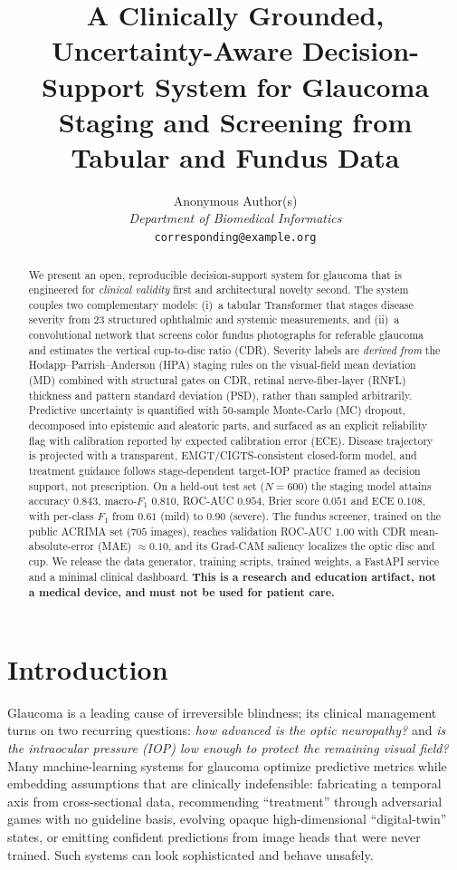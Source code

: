 \documentclass[10pt,twocolumn]{article}
\title{\textbf{A Clinically Grounded, Uncertainty-Aware Decision-Support System for
Glaucoma Staging and Screening from Tabular and Fundus Data}}
\author{%
  \normalsize Anonymous Author(s)\\
  \normalsize \textit{Department of Biomedical Informatics}\\
  \normalsize \texttt{corresponding@example.org}
}
\date{}
\begin{document}
\maketitle

\begin{abstract}
We present an open, reproducible decision-support system for glaucoma that is
engineered for \emph{clinical validity} first and architectural novelty second.
The system couples two complementary models: (i)~a tabular Transformer that stages
disease severity from $23$ structured ophthalmic and systemic measurements, and
(ii)~a convolutional network that screens color fundus photographs for referable
glaucoma and estimates the vertical cup-to-disc ratio (CDR). Severity labels are
\emph{derived from} the Hodapp--Parrish--Anderson (HPA) staging rules on the
visual-field mean deviation (MD) combined with structural gates on CDR, retinal
nerve-fiber-layer (RNFL) thickness and pattern standard deviation (PSD), rather than
sampled arbitrarily. Predictive uncertainty is quantified with $50$-sample
Monte-Carlo (MC) dropout, decomposed into epistemic and aleatoric parts, and surfaced
as an explicit reliability flag with calibration reported by expected calibration
error (ECE). Disease trajectory is projected with a transparent, EMGT/CIGTS-consistent
closed-form model, and treatment guidance follows stage-dependent target-IOP practice
framed as decision support, not prescription. On a held-out test set
($N{=}600$) the staging model attains accuracy $0.843$, macro-$F_1$ $0.810$,
ROC-AUC $0.954$, Brier score $0.051$ and ECE $0.108$, with per-class $F_1$ from
$0.61$ (mild) to $0.90$ (severe). The fundus screener, trained on the public ACRIMA
set ($705$ images), reaches validation ROC-AUC $1.00$ with CDR mean-absolute-error
(MAE) $\approx 0.10$, and its Grad-CAM saliency localizes the optic disc and cup. We
release the data generator, training scripts, trained weights, a FastAPI service and
a minimal clinical dashboard. \textbf{This is a research and education artifact, not
a medical device, and must not be used for patient care.}
\end{abstract}

\section{Introduction}
Glaucoma is a leading cause of irreversible blindness; its clinical management turns
on two recurring questions: \emph{how advanced is the optic neuropathy?} and
\emph{is the intraocular pressure (IOP) low enough to protect the remaining visual
field?} Many machine-learning systems for glaucoma optimize predictive metrics while
embedding assumptions that are clinically indefensible: fabricating a temporal axis
from cross-sectional data, recommending ``treatment'' through adversarial games with
no guideline basis, evolving opaque high-dimensional ``digital-twin'' states, or
emitting confident predictions from image heads that were never trained. Such systems
can look sophisticated and behave unsafely.
\end{document}
